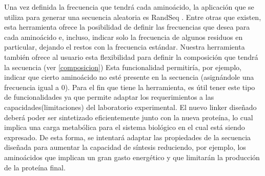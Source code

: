 
Una vez definida la frecuencia que tendrá cada aminoácido, la aplicación que se utiliza para generar una secuencia aleatoria es RandSeq \cite{randseq}.
Entre otras que existen, esta herramienta ofrece la posibilidad de definir las frecuencias que desea para cada aminoácido e, incluso,
indicar solo la frecuencia de algunos residuos en particular, dejando el restos con la frecuencia estándar. 
Nuestra herramienta también ofrece al usuario esta flexibilidad para definir la composición que tendrá la secuencia (ver \ref{composicion})
Esta funcionalidad permitiría, por ejemplo, indicar que cierto aminoácido no esté presente en la secuencia (asignándole una frecuencia igual a 0). 
Para el fin que tiene la herramienta, es útil tener este tipo de funcionalidades ya que permite adaptar los requerimientos a las capacidades(limitaciones) del laboratorio experimental. 
El nuevo linker diseñado deberá poder ser sintetizado eficientemente junto con la nueva proteína, lo cual implica una carga metabólica para el sistema biológico en el cual está siendo expresado. 
De esta forma, se intentará adaptar las propiedades de la secuencia diseñada para aumentar la capacidad de síntesis reduciendo, por ejemplo, los aminoácidos que implican un gran gasto energético
y que limitarán la producción de la proteína final.







